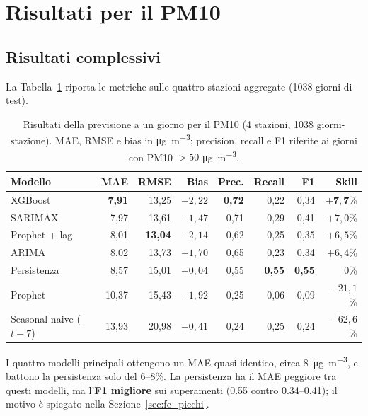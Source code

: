 \documentclass[11pt]{report}
\newcommand{\ugm}{\si{\micro\gram\per\cubic\metre}}
\begin{document}
\section{Risultati per il PM10}
\label{sec:fc_risultati}

\subsection{Risultati complessivi}
La Tabella~\ref{tab:fc_risultati_pm10} riporta le metriche sulle quattro stazioni
aggregate (\num{1038} giorni di test).

\begin{table}[H]
  \centering
  \caption{Risultati della previsione a un giorno per il PM10 (4 stazioni, \num{1038} giorni-stazione). MAE, RMSE e bias in \ugm; precision, recall e F1 riferite ai giorni con PM10 $> 50$ \ugm.}
  \label{tab:fc_risultati_pm10}
  \small
  \begin{tabular}{l r r r r r r r}
    \toprule
    \textbf{Modello} & \textbf{MAE} & \textbf{RMSE} & \textbf{Bias} & \textbf{Prec.} & \textbf{Recall} & \textbf{F1} & \textbf{Skill} \\
    \midrule
    XGBoost & \textbf{7,91} & 13,25 & $-2{,}22$ & \textbf{0,72} & 0,22 & 0,34 & $\mathbf{+7{,}7}$\% \\
    SARIMAX & 7,97 & 13,61 & $-1{,}47$ & 0,71 & 0,29 & 0,41 & $+7{,}0$\% \\
    Prophet + lag & 8,01 & \textbf{13,04} & $-2{,}14$ & 0,62 & 0,25 & 0,35 & $+6{,}5$\% \\
    ARIMA & 8,02 & 13,73 & $-1{,}70$ & 0,65 & 0,23 & 0,34 & $+6{,}4$\% \\
    Persistenza & 8,57 & 15,01 & $+0{,}04$ & 0,55 & \textbf{0,55} & \textbf{0,55} & 0\% \\
    Prophet & 10,37 & 15,43 & $-1{,}92$ & 0,25 & 0,06 & 0,09 & $-21{,}1$\% \\
    Seasonal naive ($t-7$) & 13,93 & 20,98 & $+0{,}41$ & 0,24 & 0,25 & 0,24 & $-62{,}6$\% \\
    \bottomrule
  \end{tabular}
\end{table}

I quattro modelli principali ottengono un MAE quasi identico, circa
\SI{8}{\micro\gram\per\cubic\metre}, e battono la persistenza solo del 6--8\%. La
persistenza ha il MAE peggiore tra questi modelli, ma l'\textbf{F1 migliore} sui
superamenti (\num{0.55} contro \num{0.34}--\num{0.41}); il motivo è spiegato nella
Sezione~\ref{sec:fc_picchi}.
\end{document}
